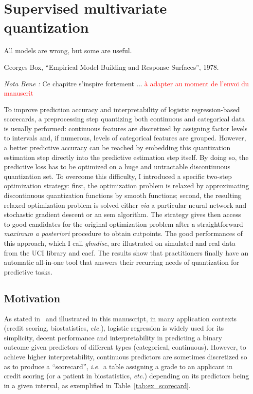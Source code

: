 \chapter{Supervised multivariate quantization} \label{chap4}


\epigraph{All models are wrong, but some are useful.}{Georges Box, ``Empirical Model-Building and Response Surfaces'', 1978.}

\minitoc

\textit{Nota Bene :} Ce chapitre s'inspire fortement ... \textcolor{red}{à adapter au moment de l'envoi du manuscrit}

\bigskip

To improve prediction accuracy and interpretability of logistic regression-based scorecards, a preprocessing step quantizing both continuous and categorical data is usually performed: continuous features are discretized by assigning factor levels to intervals and, if numerous, levels of categorical features are grouped. However, a better predictive accuracy can be reached by embedding this quantization estimation step directly into the predictive estimation step itself. By doing so, the predictive loss has to be optimized on a huge and untractable discontinuous quantization set. To overcome this difficulty, I introduced a specific two-step optimization strategy: first, the optimization problem is relaxed by approximating discontinuous quantization functions by smooth functions; second, the resulting relaxed optimization problem is solved either \textit{via} a particular neural network and stochastic gradient descent or an \gls{sem} algorithm. The strategy gives then access to good candidates for the original optimization problem after a straightforward \textit{maximum a posteriori} procedure to obtain cutpoints. The good performances of this approach, which I call \textit{glmdisc}, are illustrated on simulated and real data from the UCI library and \gls{cacf}. The results show that practitioners finally have an automatic all-in-one tool that answers their recurring needs of quantization for predictive tasks.
 
\section{Motivation} \label{sec:motivation}

As stated in~\cite{hosmer2013applied} and illustrated in this manuscript, in many application contexts (credit scoring, biostatistics, {\it etc.}), logistic regression is widely used for its simplicity, decent performance and interpretability in predicting a binary outcome given predictors of different types (categorical, continuous). However, to achieve  higher interpretability, continuous predictors are sometimes discretized so as to produce a ``scorecard'', \textit{i.e.}\ a table assigning a grade to an applicant in credit scoring (or a patient in biostatistics, {\it etc.}) depending on its predictors being in a given interval, as exemplified in Table~\ref{tab:ex_scorecard}.

